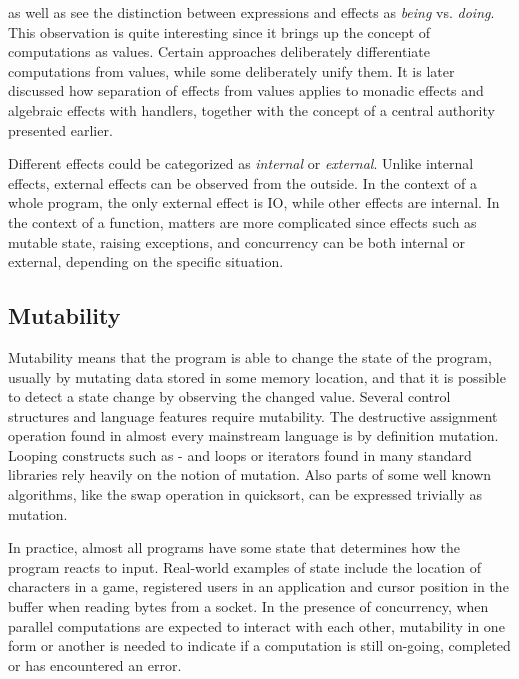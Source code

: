 \textcite{imperative-fp} as well as \textcite{do-be-do-be-do} see the distinction between expressions and effects as \emph{being} vs. \emph{doing}. This observation is quite interesting since it brings up the concept of computations as values. Certain approaches deliberately differentiate computations from values, while some deliberately unify them. It is later discussed how separation of effects from values applies to monadic effects and algebraic effects with handlers, together with the concept of a central authority presented earlier.

Different effects could be categorized as \emph{internal} or \emph{external}. Unlike internal effects, external effects can be observed from the outside. In the context of a whole program, the only external effect is IO, while other effects are internal. In the context of a function, matters are more complicated since effects such as mutable state, raising exceptions, and concurrency can be both internal or external, depending on the specific situation.


\subsection{Mutability} 
Mutability means that the program is able to change the state of the program, usually by mutating data stored in some memory location, and that it is possible to detect a state change by observing the changed value. Several control structures and language features require mutability. The destructive assignment operation found in almost every mainstream language is by definition mutation.~\cite[Chapter~3]{sicp} Looping constructs such as - and  loops or iterators found in many standard libraries rely heavily on the notion of mutation. Also parts of some well known algorithms, like the swap operation in quicksort, can be expressed trivially as mutation.

In practice, almost all programs have some state that determines how the program reacts to input. Real-world examples of state include the location of characters in a game, registered users in an application and cursor position in the buffer when reading bytes from a socket. In the presence of concurrency, when parallel computations are expected to interact with each other, mutability in one form or another is needed to indicate if a computation is still on-going, completed or has encountered an error.



